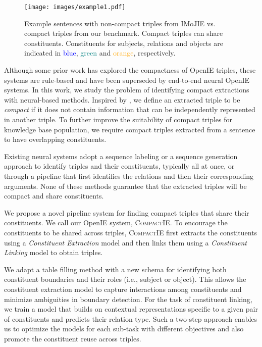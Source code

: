 \documentclass[11pt,a4paper]{article}
\newcommand{\system}{{\textsc{CompactIE}}}
\begin{document}
\begin{figure}
\centering
\texttt{[image: images/example1.pdf]}
\caption{Example sentences with non-compact triples from IMoJIE vs. compact triples from our benchmark. Compact triples can share constituents. Constituents for subjects, relations and objects are indicated in \textcolor{blue}{blue}, \textcolor{teal}{green} and \textcolor{orange}{orange}, respectively.}
\label{fig:exp1}
\vspace{-1.4em}
\end{figure}

{Although some prior work \cite{clausie,minie,nestie} has explored the compactness of OpenIE triples, these systems are rule-based and have been superseded by end-to-end neural OpenIE systems.}
In this work, we study the problem of identifying compact extractions with neural-based methods. Inspired by \citep{clausie}, we define an extracted triple to be {\it compact} if it does not contain information that can be independently represented in another triple. To further improve the suitability of compact triples for knowledge base population, we require compact triples extracted from a sentence to have overlapping constituents. 


Existing neural systems adopt a {sequence labeling} \cite{openie6, wang2021unire,multi2OIE} or a {sequence generation} \cite{imojie} approach to identify triples and their constituents, typically all at once, or {through a pipeline that first identifies the relations and then their corresponding arguments. None of these methods guarantee that the extracted triples will be compact and share constituents.}

We propose a novel pipeline system for finding compact triples that share their constituents. We call our OpenIE system, \system{}. {To encourage the constituents to be shared across triples, \system{} first extracts the constituents using a  {\it Constituent Extraction} model and then links them using a {\it Constituent Linking} model to obtain triples.}

We adapt a table filling method \cite{wang2021unire} with a new schema for identifying both constituent boundaries and their roles (i.e., subject or object). This allows the constituent extraction model to capture interactions among constituents and minimize ambiguities in boundary detection. {For the task of constituent linking, we train a model that builds on contextual representations specific to a given pair of constituents and predicts their relation type.}
Such a two-step approach enables us to optimize the models for each sub-task with different objectives and also promote the constituent reuse across triples.
\end{document}
